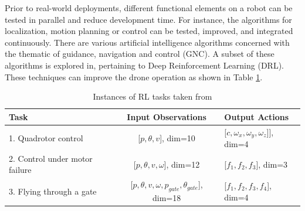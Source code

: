 Prior to real-world deployments, different functional elements on a robot can be tested in parallel and reduce development time. For instance, the algorithms for localization, motion planning or control can be tested, improved, and integrated continuously. There are various artificial intelligence algorithms concerned with the thematic of guidance, navigation and control (GNC). A subset of these algorithms is explored in,  pertaining to Deep Reinforcement Learning (DRL). These techniques can improve the drone operation as shown in Table \ref{tab:RL_applications}.

\begin{table}[h]
  \raggedright
  \footnotesize%
    \begin{tabular}{lcl}
      \toprule
      \textbf{Task}          & \textbf{Input Observations} & \textbf{Output Actions} \\
                                   
      \midrule
      1. Quadrotor control               & [$p, \theta, v$], dim=10  
      & [$c, \omega_{x}, \omega_{y}, \omega_{z}$]], dim=4    \\
      2. Control under motor failure   &  [$p, \theta, v, \omega$], dim=12  
      & [$f_{1}, f_{2}, f_{3}$], dim=3    \\ 
      3. Flying through a gate        & [$p, \theta, v, \omega, p_{gate}, \theta_{gate}$], dim=18 
      & [$f_{1}, f_{2}, f_{3}, f_{4}$], dim=4    \\ 
      \bottomrule
      
    \end{tabular}
  \caption{Instances of RL tasks taken from \cite{drl_review}}
  \label{tab:RL_applications}
\end{table}


